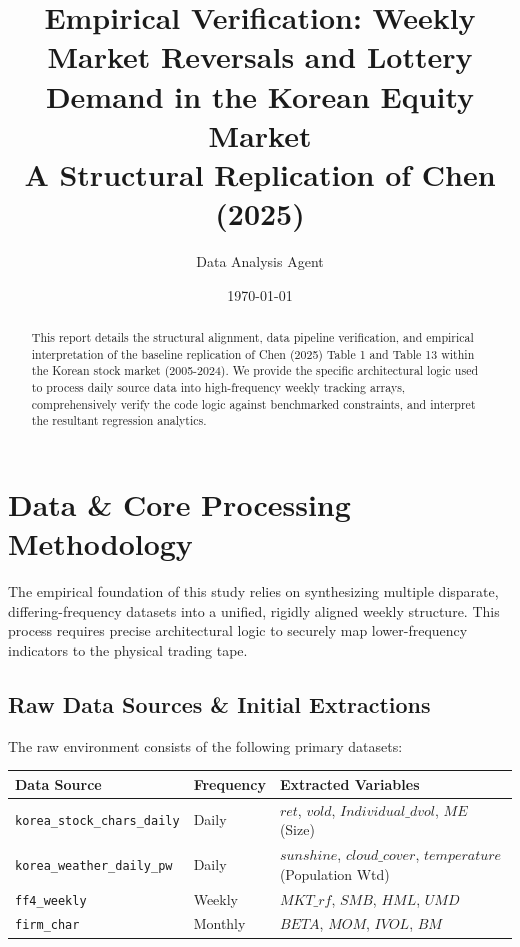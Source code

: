 \documentclass[11pt,a4paper]{article}
\title{Empirical Verification: Weekly Market Reversals and Lottery Demand in the Korean Equity Market\\
\large A Structural Replication of Chen (2025)}
\author{Data Analysis Agent}
\date{\today}
\begin{document}
\maketitle

\begin{abstract}
This report details the structural alignment, data pipeline verification, and empirical interpretation of the baseline replication of Chen (2025) Table 1 and Table 13 within the Korean stock market (2005-2024). We provide the specific architectural logic used to process daily source data into high-frequency weekly tracking arrays, comprehensively verify the code logic against benchmarked constraints, and interpret the resultant regression analytics.
\end{abstract}

\section{Data \& Core Processing Methodology}

The empirical foundation of this study relies on synthesizing multiple disparate, differing-frequency datasets into a unified, rigidly aligned weekly structure. This process requires precise architectural logic to securely map lower-frequency indicators to the physical trading tape.

\subsection{Raw Data Sources \& Initial Extractions}
The raw environment consists of the following primary datasets:

\begin{table}[h]
\centering
\begin{tabular}{@{}llp{8cm}@{}}
\toprule
\textbf{Data Source} & \textbf{Frequency} & \textbf{Extracted Variables} \\ \midrule
\texttt{korea\_stock\_chars\_daily} & Daily & $ret$, $vold$, $Individual\_dvol$, $ME$ (Size) \\
\texttt{korea\_weather\_daily\_pw} & Daily & $sunshine$, $cloud\_cover$, $temperature$ (Population Wtd) \\
\texttt{ff4\_weekly} & Weekly & $MKT\_rf$, $SMB$, $HML$, $UMD$ \\
\texttt{firm\_char} & Monthly & $BETA$, $MOM$, $IVOL$, $BM$ \\ \bottomrule
\end{tabular}
\end{table}
\end{document}
